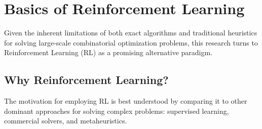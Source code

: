 \section{Basics of Reinforcement Learning}
\label{sec:rl}

Given the inherent limitations of both exact algorithms and traditional heuristics for solving large-scale combinatorial optimization problems, this research turns to Reinforcement Learning (RL) as a promising alternative paradigm.

\subsection{Why Reinforcement Learning?}

The motivation for employing RL is best understood by comparing it to other dominant approaches for solving complex problems: supervised learning, commercial solvers, and metaheuristics.

